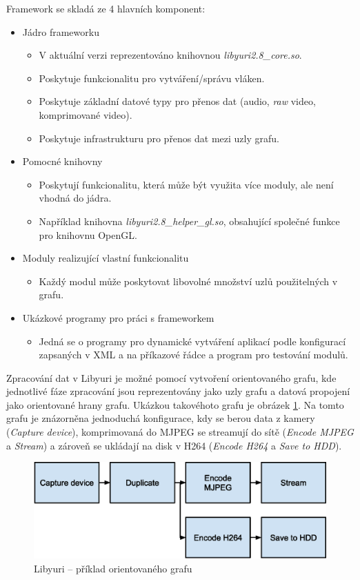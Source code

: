 \documentclass[thesis=M,czech]{FITthesis}[2012/06/26]
\begin{document}
Framework se skladá ze 4 hlavních komponent:
\begin{itemize}
\item Jádro frameworku
  \begin{itemize}
  	\item V aktuální verzi reprezentováno knihovnou \textit{libyuri2.8\_core.so}.
    \item Poskytuje funkcionalitu pro vytváření/správu vláken.
    \item Poskytuje základní datové typy pro přenos dat (audio, \textit{raw} video, komprimované video).
    \item Poskytuje infrastrukturu pro přenos dat mezi uzly grafu.
  \end{itemize}
\item Pomocné knihovny
  \begin{itemize}
    \item Poskytují funkcionalitu, která může být využita více moduly, ale není vhodná do jádra.
  	\item Například knihovna \textit{libyuri2.8\_helper\_gl.so}, obsahující společné funkce pro knihovnu OpenGL.
  \end{itemize}
\item Moduly realizující vlastní funkcionalitu
  \begin{itemize}
    \item Každý modul může poskytovat libovolné množství uzlů použitelných v grafu.
  \end{itemize}
\item Ukázkové programy pro práci s frameworkem
  \begin{itemize}
    \item Jedná se o programy pro dynamické vytváření aplikací podle konfigurací zapsaných v XML a na příkazové řádce a program pro testování modulů.
  \end{itemize}
\end{itemize}

Zpracování dat v Libyuri je možné pomocí vytvoření orientovaného grafu, kde jednotlivé fáze zpracování jsou reprezentovány jako uzly grafu a datová propojení jako orientované hrany grafu. Ukázkou takovéhoto grafu je obrázek \ref{img:yuri_example}.
Na tomto grafu je znázorněna jednoduchá konfigurace, kdy se berou data z kamery (\textit{Capture device}), komprimovaná do MJPEG  se streamují do sítě (\textit{Encode MJPEG} a \textit{Stream}) a zároveň se ukládají na disk v H264 (\textit{Encode H264} a \textit{Save to HDD}).
\\
\begin{figure}[h]\centering
	\includegraphics[width=1\textwidth]{images/yuri_example.eps}
	\caption{Libyuri -- příklad orientovaného grafu}\label{img:yuri_example}
\end{figure}
\end{document}
